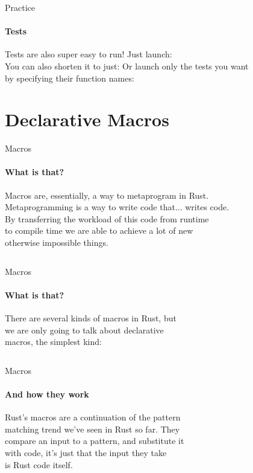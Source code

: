 \documentclass[usenames,dvipsnames,10pt,aspectratio=169]{beamer}
\begin{document}
\begin{frame}{Practice}
	\framesubtitle{Tests}
	\large
	Tests are also super easy to run! Just launch:\\
	\vspace{0.3cm}
	You can also shorten it to just: 
	\vspace{0.3cm}
Or launch only the tests you want\\
by specifying their function names: 
	
\end{frame}


\section{Declarative Macros}

\begin{frame}{Macros}
	\framesubtitle{What is that?}
	\large
	Macros are, essentially, a way to metaprogram in Rust.\\
	\vspace{0.2cm}
	Metaprogramming is a way to write code that... writes code.\\
	By transferring the workload of this code from runtime\\
	to compile time we are able to achieve a lot of new\\
	otherwise impossible things.
	
	\vspace{0.5cm}
	\inputminted[fontsize=\large]{rust}{code/macros1.rs}
\end{frame}

\begin{frame}{Macros}
	\framesubtitle{What is that?}
	\large
	There are several kinds of macros in Rust, but\\
	we are only going to talk about declarative\\
	macros, the simplest kind:
	
	\vspace{0.5cm}
	\inputminted[fontsize=\Large]{rust}{code/macros2.rs}
\end{frame}

\begin{frame}{Macros}
	\framesubtitle{And how they work}
	\Large
	Rust's macros are a continuation of the pattern\\
	matching trend we've seen in Rust so far. They\\
	compare an input to a pattern, and substitute it\\
	with code, it's just that the input they take\\
	is Rust code itself.
	
	\vspace{0.2cm}
\end{frame}
\end{document}
